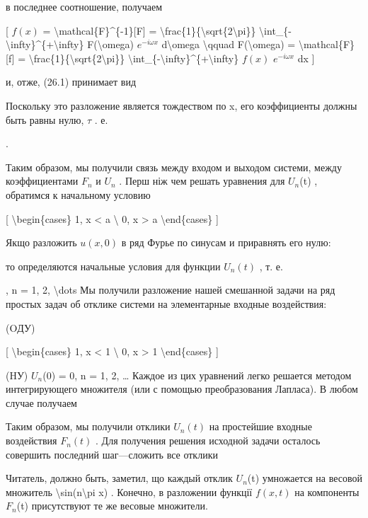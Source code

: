 \documentclass[
]{article}
\begin{document}
{{в последнее соотношение, получаем

{[} \(f(x)\) = \textbackslash mathcal\{F\}\^{}\{-1\}{[}F{]} =
\textbackslash frac\{1\}\{\textbackslash sqrt\{2\textbackslash pi\}\}
\textbackslash int\_\{-\textbackslash infty\}\^{}\{+\textbackslash infty\}
F(\textbackslash omega) \(e^{-i\omega x}\) d\textbackslash omega
\textbackslash qquad F(\textbackslash omega) =
\textbackslash mathcal\{F\}{[}f{]} =
\textbackslash frac\{1\}\{\textbackslash sqrt\{2\textbackslash pi\}\}
\textbackslash int\_\{-\textbackslash infty\}\^{}\{+\textbackslash infty\}
\(f(x)\) \(e^{-i\omega x}\) dx {]}

и, отже, (26.1) принимает вид

Поскольку это разложение является тождеством по x, его коэффициенты
должны быть равны нулю, \(\tau\) . е.

.

Таким образом, мы получили связь между входом и выходом системи, между
коэффициентами \(F_n\) и \(U_n\) . Перш ніж чем решать уравнения для
\(U_n\)(t) , обратимся к начальному условию

{[} \textbackslash begin\{cases\} 1, \textbar x\textbar{} \textless{} a
\textbackslash{} 0, \textbar x\textbar{} \textgreater{} a
\textbackslash end\{cases\} {]}

Якщо разложить \(u(x, 0)\) в ряд Фурье по синусам и приравнять его нулю:

то определяются начальные условия для функции \(U_n\left(t\right)\) , т.
е.

, n = 1, 2, \textbackslash dots Мы получили разложение нашей смешанной
задачи на ряд простых задач об отклике системи на элементарные входные
воздействия:

(OДУ)

{[} \textbackslash begin\{cases\} 1, \textbar x\textbar{} \textless{} 1
\textbackslash{} 0, \textbar x\textbar{} \textgreater{} 1
\textbackslash end\{cases\} {]}

(HУ) \(U_n\)(0) = 0, n = 1, 2, \ldots{} Каждое из цих уравнений легко
решается методом интегрирующего множителя (или с помощью преобразования
Лапласа). В любом случае получаем

Таким образом, мы получили отклики \(U_n(t)\) на простейшие входные
воздействия \(F_n(t)\) . Для получения решения исходной задачи осталось
совершить последний шаг---сложить все отклики

Читатель, должно быть, заметил, що каждый отклик \(U_n\)(t) умножается
на весовой множитель \textbackslash sin(n\textbackslash pi x) . Конечно,
в разложении функції \(f(x, t)\) на компоненты \(F_n\)(t) присутствуют
те же весовые множители.

}}
\end{document}
